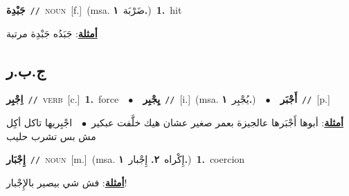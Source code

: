 \documentclass[10pt,a4paper,twoside]{article} %
\begin{document}
\begin{multicols}{2}
{{\setlength\topsep{0pt}\textbf{\foreignlanguage{arabic}{جَبْدِة}}\ {\color{gray}\texttt{//}\color{black}}\ \textsc{noun}\ [f.]\ \color{gray}(msa. \foreignlanguage{arabic}{ضَرْبَة}~\foreignlanguage{arabic}{\textbf{١.}})\color{black}\ \textbf{1.}~hit\  \begin{flushright}\color{gray}\foreignlanguage{arabic}{\textbf{\underline{\foreignlanguage{arabic}{أمثلة}}}: جَبَدُه جَبْدِة مرتبة}\end{flushright}\color{black}} \vspace{2mm}

\vspace{-3mm}
\subsection*{\color{blue}\foreignlanguage{arabic}{ج.ب.ر}\color{blue}{}} 

{\setlength\topsep{0pt}\textbf{\foreignlanguage{arabic}{اِجْبِر}}\ {\color{gray}\texttt{//}\color{black}}\ \textsc{verb}\ [c.]\ \textbf{1.}~force\ \ $\bullet$\ \ \setlength\topsep{0pt}\textbf{\foreignlanguage{arabic}{يِجْبِر}}\ {\color{gray}\texttt{//}\color{black}}\ [i.]\ \color{gray}(msa. \foreignlanguage{arabic}{يُجْبِر}~\foreignlanguage{arabic}{\textbf{١.}})\color{black}\ \ $\bullet$\ \ \setlength\topsep{0pt}\textbf{\foreignlanguage{arabic}{أَجْبَر}}\ {\color{gray}\texttt{//}\color{black}}\ [p.]\  \begin{flushright}\color{gray}\foreignlanguage{arabic}{\textbf{\underline{\foreignlanguage{arabic}{أمثلة}}}: أبوها أَجْبَرها عالجيزة بعمر صغير عشان هيك خلَّفت عبكير\ $\bullet$\ \  اجْبِريها تاكل أكِل مش بس تشرب حليب}\end{flushright}\color{black}} \vspace{2mm}

{\setlength\topsep{0pt}\textbf{\foreignlanguage{arabic}{إِجْبَار}}\ {\color{gray}\texttt{//}\color{black}}\ \textsc{noun}\ [m.]\ \color{gray}(msa. \foreignlanguage{arabic}{إِكْراه}~\foreignlanguage{arabic}{\textbf{٢.}}  \foreignlanguage{arabic}{إِجْبار}~\foreignlanguage{arabic}{\textbf{١.}})\color{black}\ \textbf{1.}~coercion\  \begin{flushright}\color{gray}\foreignlanguage{arabic}{\textbf{\underline{\foreignlanguage{arabic}{أمثلة}}}: فش شي بيصير بالإِجْبار!}\end{flushright}\color{black}} \vspace{2mm}

}
\end{multicols}
\end{document}
